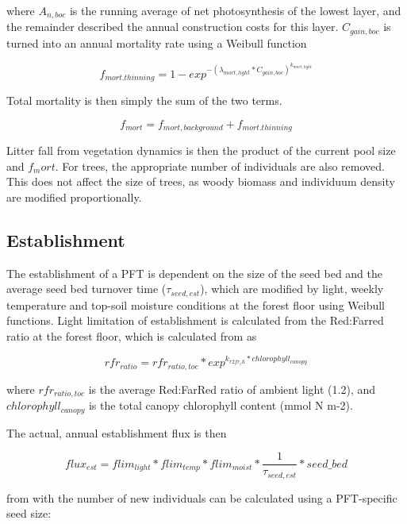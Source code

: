  where $A_{n,boc}$ is the running average of net photosynthesis of the lowest layer, and the remainder described the annual construction costs for this layer. $C_{gain,boc}$ is turned into an annual mortality rate using a Weibull function
 
\begin{equation}
f_{mort.thinning} = 1 - exp^{-(\lambda_{mort,light}*C_{gain,boc} )^{k_{mort,light}}}
\end{equation}

Total mortality is then simply the sum of the two terms.

\begin{equation}
f_{mort} =  f_{mort,background} + f_{mort.thinning}
\end{equation}

Litter fall from vegetation dynamics is then the product of the current pool size and $f_mort$. For trees, the appropriate number of individuals are also removed. This does not affect the size of trees, as woody biomass and individuum density are modified proportionally.

 \subsection{Establishment}
 
The establishment of a PFT is dependent on the size of the seed bed and the average seed bed turnover time ($\tau_{seed,est}$), which are modified by light, weekly temperature and top-soil moisture conditions at the forest floor using Weibull functions. Light limitation of establishment is calculated from the Red:Farred ratio at the forest floor, which is calculated from \cite{Kull:1998cr} as
 
 \begin{equation}
rfr_{ratio} = rfr_{ratio,toc} * exp ^{k_{r2fr_ch} * chlorophyll_{canopy}} 
\end{equation}
   
where $rfr_{ratio,toc}$ is the average Red:FarRed ratio of ambient light (1.2), and $chlorophyll_{canopy}$ is the total canopy chlorophyll content (mmol N m-2).  
  
The actual, annual establishment flux is then

\begin{equation}
flux_{est} = flim_{light} * flim_{temp} * flim_{moist} * \frac{1}{\tau_{seed,est}} * seed\_bed
\end{equation}
  
from with the number of new individuals can be calculated using a PFT-specific seed size:

